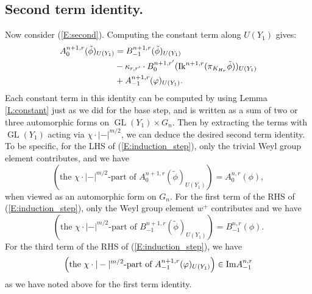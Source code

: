 \documentclass[10pt]{amsart}
\theoremstyle{plain}
\numberwithin{equation}{section}
\begin{document}
 \subsection{\bf Second term identity.}
 Now consider (\ref{E:second}). Computing the constant term along $U(Y_1)$ gives:
\begin{align}\label{E:induction_step}
A_0^{n+1,r}(\tilde{\phi})_{U(Y_1)} &=  
B^{n+1,r}_{-1}(\tilde{\phi})_{U(Y_1)} \\
& - \kappa_{r,r'}  
\cdot B_0^{n+1,  r'}({\operatorname{Ik}}^{n+1,r}(\pi_{K_{H_r}}\tilde{\phi}))_{U(Y_1)} \notag\\
&+ A^{n+1,r}_{-1}(\varphi)_{U(Y_1)}.\notag
\end{align}
Each constant term in this identity can be computed by using Lemma
\ref{L:constant} just as we did for the base step, and is written as a
sum of two or three automorphic forms on
${\operatorname{GL}}(Y_1)\times G_{n}$. Then by extracting the terms with ${\operatorname{GL}}(Y_1)$ acting
via $\chi \cdot |-|^{m/2}$, we can deduce the desired second term
identity. To be specific, for the LHS of (\ref{E:induction_step}), only the trivial Weyl group
element contributes, and we have
\begin{equation}\label{E:induction_step1}
\left(\text{the $\chi \cdot |-|^{m/2}$-part of
  $A_0^{n+1,r}(\tilde{\phi})_{U(Y_1)} $}\right)
= A_0^{n,r}(\phi),
\end{equation}
when viewed as an automorphic form on $G_n$. For the first term of the
RHS of (\ref{E:induction_step}), only the Weyl group element $w^+$ contributes
and we have
\begin{equation}\label{E:induction_step2}
\left(\text{the $\chi \cdot |-|^{m/2}$-part of
  $B^{n+1,r}_{-1}(\tilde{\phi})_{U(Y_1)}$}\right)
= B_{-1}^{n,r}(\phi).
\end{equation}
For the third term of
the RHS of (\ref{E:induction_step}), we have
\begin{equation}\label{E:induction_step3}
 \left(\text{the $\chi \cdot |-|^{m/2}$-part of $A^{n+1,
     r}_{-1}(\varphi)_{U(Y_1)} $}\right)\in {\rm Im} A^{n,r}_{-1}
\end{equation}
as we have noted above for the first term identity. 
\vskip 5pt
\end{document}
